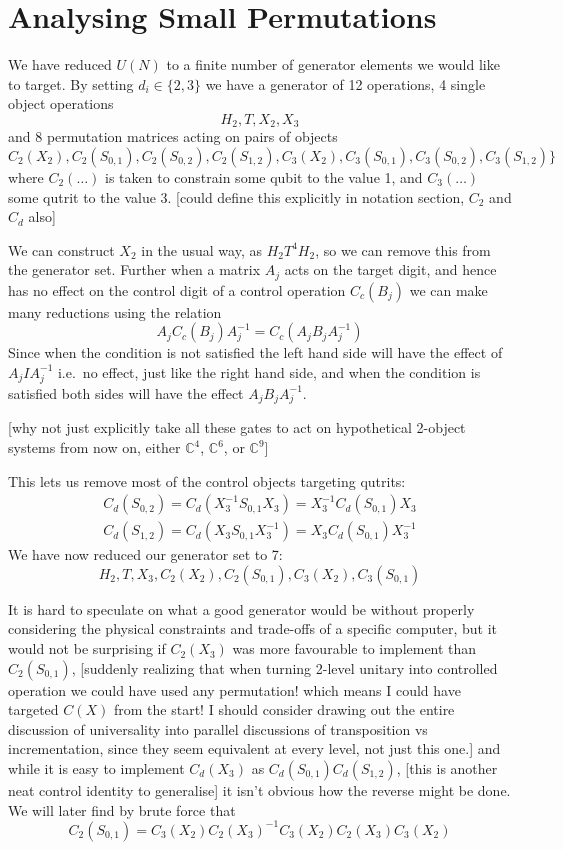 \section{Analysing Small Permutations}
We have reduced $U(N)$ to a finite number of generator elements we would like to target. By setting $d_i \in \{2, 3\}$ we have a generator of 12 operations, 4 single object operations
\[H_2, T, X_2, X_3\]
and 8 permutation matrices acting on pairs of objects
\[C_2(X_2), C_2(S_{0,1}), C_2(S_{0, 2}), C_2(S_{1, 2}), C_3(X_2), C_3(S_{0, 1}), C_3(S_{0, 2}), C_3(S_{1, 2})\}\]
where $C_2(\dots)$ is taken to constrain some qubit to the value 1, and $C_3(\dots)$ some qutrit to the value 3. [could define this explicitly in notation section, $C_2$ and $C_d$ also]

We can construct $X_2$ in the usual way, as $H_2T^4H_2$, so we can remove this from the generator set. Further when a matrix $A_j$ acts on the target digit, and hence has no effect on the control digit of a control operation $C_c(B_j)$ we can make many reductions using the relation
\[A_jC_c(B_j)A_j^{-1} = C_c(A_jB_jA_j^{-1})\]
Since when the condition is not satisfied the left hand side will have the effect of $A_jIA_j^{-1}$ i.e.\ no effect, just like the right hand side, and when the condition is satisfied both sides will have the effect $A_jB_jA_j^{-1}$.

[why not just explicitly take all these gates to act on hypothetical 2-object systems from now on, either $\mathbb{C}^4$, $\mathbb{C}^6$, or $\mathbb{C}^9$]

This lets us remove most of the control objects targeting qutrits:
\begin{align*}
	C_d(S_{0, 2}) = C_d(X_3^{-1}S_{0,1}X_3) = X_3^{-1}C_d(S_{0,1})X_3
	\\
	C_d(S_{1, 2}) = C_d(X_3S_{0,1}X_3^{-1}) = X_3C_d(S_{0,1})X_3^{-1}
\end{align*}
We have now reduced our generator set to 7:
\[H_2, T, X_3, C_2(X_2), C_2(S_{0, 1}), C_3(X_2), C_3(S_{0, 1})\]

It is hard to speculate on what a good generator would be without properly considering the physical constraints and trade-offs of a specific computer, but it would not be surprising if $C_2(X_3)$ was more favourable to implement than $C_2(S_{0, 1})$, [suddenly realizing that when turning 2-level unitary into controlled operation we could have used any permutation! which means I could have targeted $C(X)$ from the start! I should consider drawing out the entire discussion of universality into parallel discussions of transposition vs incrementation, since they seem equivalent at every level, not just this one.] and while it is easy to implement $C_d(X_3)$ as $C_d(S_{0,1})C_d(S_{1,2})$, [this is another neat control identity to generalise] it isn't obvious how the reverse might be done. We will later find by brute force that
\[C_2(S_{0,1}) = C_3(X_2) C_2(X_3)^{-1} C_3(X_2) C_2(X_3) C_3(X_2)\]

